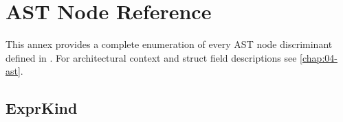 \chapter{AST Node Reference}
\label{annex:A-ast-reference}

\pnum
This annex provides a complete enumeration of every AST node discriminant defined
in .  For architectural context and struct field descriptions
see \cref{chap:04-ast}.

\section{ExprKind}
\label{sec:aref-exprkind}


